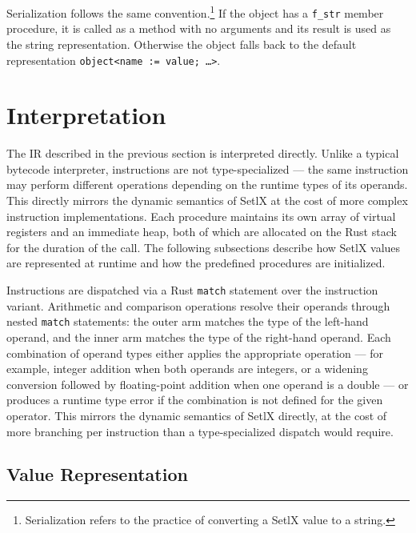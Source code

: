 Serialization follows the same convention.\footnote{Serialization refers to the practice of converting a SetlX value to a string.} If the object has a \texttt{f\_str} member procedure, it is called as a method with no arguments and its result is used as the string representation. Otherwise the object falls back to the default representation \texttt{object<name := value; \ldots>}.

\section{Interpretation}

The \ac{IR} described in the previous section is interpreted directly. Unlike a typical bytecode interpreter, instructions are not type-specialized --- the same instruction may perform different operations depending on the runtime types of its operands. This directly mirrors the dynamic semantics of SetlX at the cost of more complex instruction implementations. Each procedure maintains its own array of virtual registers and an immediate heap, both of which are allocated on the Rust stack for the duration of the call. The following subsections describe how SetlX values are represented at runtime and how the predefined procedures are initialized.

Instructions are dispatched via a Rust \texttt{match} statement over the instruction variant. Arithmetic and comparison operations resolve their operands through nested \texttt{match} statements: the outer arm matches the type of the left-hand operand, and the inner arm matches the type of the right-hand operand. Each combination of operand types either applies the appropriate operation --- for example, integer addition when both operands are integers, or a widening conversion followed by floating-point addition when one operand is a double --- or produces a runtime type error if the combination is not defined for the given operator. This mirrors the dynamic semantics of SetlX directly, at the cost of more branching per instruction than a type-specialized dispatch would require. 

\subsection{Value Representation}
\label{sec:value-representation}

